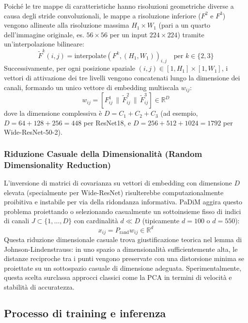 Poiché le tre mappe di caratteristiche hanno risoluzioni geometriche diverse a causa degli stride convoluzionali, le mappe a risoluzione inferiore ($F^2$ e $F^3$) vengono allineate alla risoluzione massima $H_1 \times W_1$ (pari a un quarto dell'immagine originale, es. $56 \times 56$ per un input $224 \times 224$) tramite un'interpolazione bilineare:
\begin{equation}
    \tilde{F}^k(i, j) = \text{interpolate}(F^k, (H_1, W_1))_{i,j} \quad \text{per } k \in \{2, 3\}
\end{equation}
Successivamente, per ogni posizione spaziale $(i, j) \in [1, H_1] \times [1, W_1]$, i vettori di attivazione dei tre livelli vengono concatenati lungo la dimensione dei canali, formando un unico vettore di embedding multiscala $w_{ij}$:
\begin{equation}
    w_{ij} = [ F^1_{ij} \,\|\, \tilde{F}^2_{ij} \,\|\, \tilde{F}^3_{ij} ] \in \mathbb{R}^{D}
\end{equation}
dove la dimensione complessiva è $D = C_1 + C_2 + C_3$ (ad esempio, $D = 64 + 128 + 256 = 448$ per ResNet18, e $D = 256 + 512 + 1024 = 1792$ per Wide-ResNet-50-2).

\subsubsection{Riduzione Casuale della Dimensionalità (Random Dimensionality Reduction)}
L'inversione di matrici di covarianza su vettori di embedding con dimensione $D$ elevata (specialmente per Wide-ResNet) risulterebbe computazionalmente proibitiva e instabile per via della ridondanza informativa. PaDiM aggira questo problema proiettando o selezionando casualmente un sottoinsieme fisso di indici di canali $J \subset \{1, \dots, D\}$ con cardinalità $d \ll D$ (tipicamente $d = 100$ o $d = 550$):
\begin{equation}
    x_{ij} = P_{\text{rand}} w_{ij} \in \mathbb{R}^d
\end{equation}
Questa riduzione dimensionale casuale trova giustificazione teorica nel lemma di Johnson-Lindenstrauss: in uno spazio a dimensionalità sufficientemente alta, le distanze reciproche tra i punti vengono preservate con una distorsione minima se proiettate su un sottospazio casuale di dimensione adeguata. Sperimentalmente, questa scelta surclassa approcci classici come la PCA in termini di velocità e stabilità di accuratezza.

\subsection{Processo di training e inferenza}

